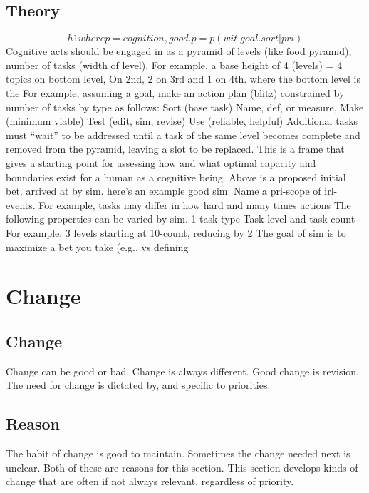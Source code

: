 \documentclass[
]{book}
\begin{document}
\section{Theory}\label{word-theory}

\[ h1 where p = cognition, good.p = p(wit.goal.sort|pri) \]
Cognitive acts should be engaged in as a pyramid of levels (like food pyramid), number of tasks (width of level).
For example, a base height of 4 (levels) = 4 topics on bottom level,
On 2nd, 2 on 3rd and 1 on 4th. where the bottom level is the
For example, assuming a goal, make an action plan (blitz) constrained by number of tasks by type as follows:
Sort (base task)
Name, def, or measure,
Make (minimum viable)
Test (edit, sim, revise)
Use (reliable, helpful)
Additional tasks must ``wait'' to be addressed until a task of the same level becomes complete and removed from the pyramid, leaving a slot to be replaced.
This is a frame that gives a starting point for assessing how and what optimal capacity and boundaries exist for a human as a cognitive being.
Above is a proposed initial bet, arrived at by sim. here's an example good sim:
Name a pri-scope of irl-events.
For example, tasks may differ in how hard and many times actions
The following properties can be varied by sim. 1-task type
Task-level and task-count
For example, 3 levels starting at 10-count, reducing by 2
The goal of sim is to maximize a bet you take (e.g., vs defining

\chapter{Change}\label{change}

\section{Change}\label{change-1}

Change can be good or bad.
Change is always different.
Good change is revision.
The need for change is dictated by, and specific to priorities.

\section{Reason}\label{reason}

The habit of change is good to maintain.
Sometimes the change needed next is unclear.
Both of these are reasons for this section.
This section develops kinds of change that are often if not always relevant, regardless of priority.
\end{document}
